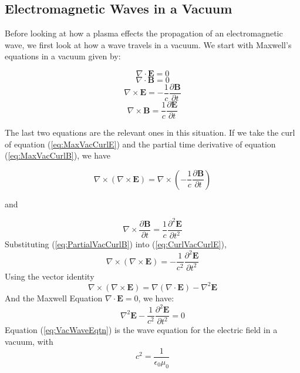 \documentclass[twocolumn]{article}
\begin{document}
\subsection*{Electromagnetic Waves in a Vacuum}
Before looking at how a plasma effects the propagation of an electromagnetic wave, we first look at how a wave travels in a vacuum.
We start with Maxwell's equations in a vacuum given by:

\begin{equation}
	\nabla \cdot \mathbf{E} = 0
\end{equation}
\begin{equation}
	\nabla \cdot \mathbf{B} = 0
\end{equation}
\begin{equation} 
	\label{eq:MaxVacCurlE}
	\nabla \times \mathbf{E} = -\frac{1}{c} \frac{\partial \mathbf{B}}{\partial t}
\end{equation}
\begin{equation} 
	\label{eq:MaxVacCurlB}
	\nabla \times \mathbf{B} = \frac{1}{c} \frac{\partial \mathbf{E}}{\partial t}
\end{equation}

The last two equations are the relevant ones in this situation.
If we take the curl of equation (\ref{eq:MaxVacCurlE}) and the partial time derivative of equation (\ref{eq:MaxVacCurlB}), we have

\begin{equation}
	\label{eq:CurlVacCurlE}
	\nabla \times ( \nabla \times \mathbf{E}) = \nabla \times (-\frac{1}{c} \frac{\partial \mathbf{B}}{\partial t}) 
\end{equation}
\begin{center}
	and
\end{center}
\begin{equation}
	\label{eq:PartialVacCurlB}
	\nabla \times \frac{\partial \mathbf{B}}{\partial t} = \frac{1}{c} \frac{\partial^2 \mathbf{E}}{\partial t^2}
\end{equation}
Substituting (\ref{eq:PartialVacCurlB}) into (\ref{eq:CurlVacCurlE}),
\begin{equation}
	\nabla \times ( \nabla \times \mathbf{E}) = -\frac{1}{c^2} \frac{\partial^2 \mathbf{E}}{\partial t^2} 
\end{equation}
Using the vector identity
\begin{equation}
	\label{eq:NablaIdent}
	\nabla \times (\nabla \times \mathbf{E}) = \nabla(\nabla \cdot \mathbf{E}) - \nabla^2\mathbf{E}
\end{equation}
And the Maxwell Equation $\nabla \cdot \mathbf{E} = 0$, we have:
\begin{equation}
	\label{eq:VacWaveEqtn}
	\nabla^2\mathbf{E} - \frac{1}{c^2} \frac{\partial^2 \mathbf{E}}{\partial t^2} = 0
\end{equation}
Equation (\ref{eq:VacWaveEqtn}) is the wave equation for the electric field in a vacuum, with
\begin{equation}
	c^2 = \frac{1}{\epsilon_0 \mu_0}
\end{equation}
\end{document}
